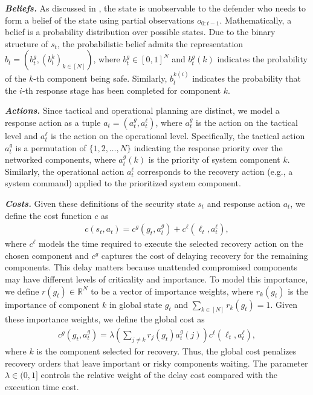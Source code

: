 \documentclass[sigconf]{acmart}
\begin{document}
\vspace{2.5mm}
\noindent\textit{\textbf{Beliefs.}}
As discussed in , the state is unobservable to the defender who needs to form a belief of the state using partial observations $o_{0:t-1}$. Mathematically, a belief is a probability distribution over possible states. Due to the binary structure of $s_t$, the probabilistic belief admits the representation $b_t=(b_t^g, (b_t^k)_{k\in [N]})$, where $b_t^g\in [0,1]^N$ and $b_t^g(k)$ indicates the probability of the $k$-th component being safe. Similarly, $b_t^{k(i)}$ indicates the probability that the $i$-th response stage has been completed for component $k$.

\vspace{2.5mm}
\noindent\textit{\textbf{Actions.}}
Since tactical and operational planning are distinct, we model a response action as a tuple $a_t=(a_t^g, a_t^{\ell})$, where $a_t^g$ is the action on the tactical level and $a_t^{\ell}$ is the action on the operational level. Specifically, the tactical action $a_t^g$ is a permutation of $\{1,2, \ldots, N\}$ indicating the response priority over the networked components, where $a_t^g(k)$ is the priority of system component $k$. Similarly, the operational action $a_t^{\ell}$ corresponds to the recovery action (e.g., a system command) applied to the prioritized system component. 

\vspace{2.5mm}
\noindent\textit{\textbf{Costs.}}
Given these definitions of the security state $s_t$ and response action $a_t$, we define the cost function $c$ as
\begin{align*}
c(s_t,a_t)=c^g(g_t, a_t^g)+c^\ell(\ell_t, a^\ell_t),
\end{align*}
where $c^\ell$ models the time required to execute the selected recovery action on the chosen component and $c^g$ captures the cost of delaying recovery for the remaining components. This delay matters because unattended compromised components may have different levels of criticality and importance. To model this importance, we define $r(g_t)\in \mathbb{R}^N$ to be a vector of importance weights, where $r_k(g_t)$ is the importance of component $k$ in global state $g_t$ and $\sum_{k\in[N]} r_k(g_t)=1$. Given these importance weights, we define the global cost as
\begin{align*}
c^g(g_t,a_t^g) = \lambda \left(\sum_{j\neq k} r_j(g_t)a_t^g(j)\right) c^\ell(\ell_t,a_t^\ell),
\end{align*}
where $k$ is the component selected for recovery. Thus, the global cost penalizes recovery orders that leave important or risky components waiting. The parameter $\lambda\in(0,1]$ controls the relative weight of the delay cost compared with the execution time cost.
\end{document}
